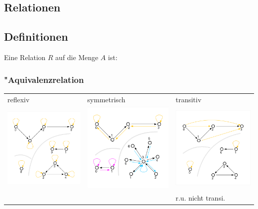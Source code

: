 \documentclass[10pt,a4paper,landscape]{article}
\begin{document}
\begin{multicols*}{3}
		\section{Relationen}
		\subsection{Definitionen}
		Eine Relation $R$ auf die Menge $A$ ist:
		\subsubsection{"Aquivalenzrelation}
		
		\begin{center} 
			\centering
			\begin{tabular}{lll}
				reflexiv                                              & symmetrisch                                            & transitiv                                              \\
				\includegraphics[width=0.27\linewidth]{reflexivgraph} & \includegraphics[width=0.27\linewidth]{symmetriegraph} & \includegraphics[width=0.27\linewidth]{transitivgraph} \\
				&                                                        & r.u. nicht transi.                                     
			\end{tabular}
		\end{center}
		

\end{multicols*}
\end{document}
